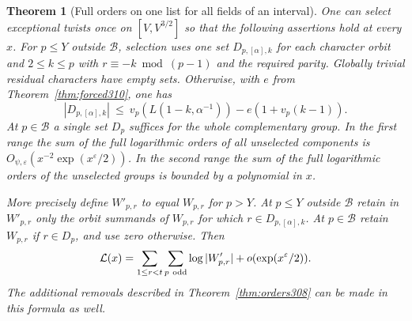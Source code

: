 \documentclass[a4paper,11pt]{article}
\newtheorem{theorem}[proposition]{Theorem}
\theoremstyle{definition}
\theoremstyle{remark}
\numberwithin{equation}{section}
\begin{document}
\begin{theorem}[Full orders on one list for all fields of an interval]\leavevmode
\label{thm:entireinterval310}
One can select exceptional twists once on \([V,V^{3/2}]\) so that
the following assertions hold at every \(x\). For \(p\le Y\)
outside \(\mathcal B\), selection uses one set
\(D_{p,[\alpha],k}\) for each character orbit and
\(2\le k\le p\) with \(r\equiv-k\bmod(p-1)\) and the required
parity. Globally trivial residual characters have empty sets.
Otherwise, with \(e\) from Theorem~\ref{thm:forced310}, one has
\[
 |D_{p,[\alpha],k}|
   \ \le\ v_p(L(1-k,\alpha^{-1}))-e(1+v_p(k-1)).
\]
At \(p\in\mathcal B\) a single set \(D_p\) suffices for the
whole complementary group. In the first range the sum of the
full logarithmic orders of all unselected components is
\(O_{\psi,\varepsilon}(x^{-2}\exp(x^\varepsilon/2))\).
In the second range the sum of the full logarithmic orders of
the unselected groups is bounded by a polynomial in \(x\).

More precisely define \(W'_{p,r}\) to equal \(W_{p,r}\) for
\(p>Y\). At \(p\le Y\) outside \(\mathcal B\) retain in \(W'_{p,r}\)
only the orbit summands of \(W_{p,r}\) for which
\(r\in D_{p,[\alpha],k}\). At \(p\in\mathcal B\) retain \(W_{p,r}\)
if \(r\in D_p\), and use zero otherwise. Then
\[
       \mathcal L(x)=\sum_{1\le r<t}\sum_{p\ {\rm odd}}
                 \log|W'_{p,r}|+o(\exp(x^\varepsilon/2)).
\]
The additional removals described in Theorem~\ref{thm:orders308}
can be made in this formula as well.
\end{theorem}
\end{document}
